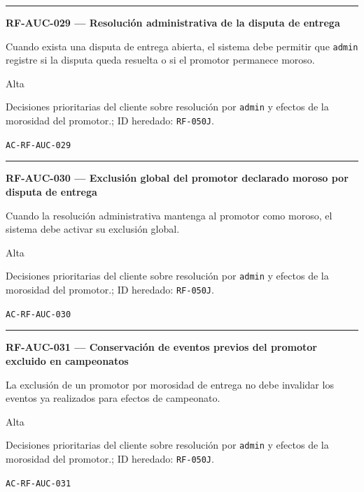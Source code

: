 \documentclass[10pt,letterpaper]{article}
\begin{document}
\vspace{0.25em}\hrule\vspace{0.65em}
\noindent\textbf{RF-AUC-029 --- Resolución administrativa de la disputa de entrega}\par
\begin{description}[style=nextline,leftmargin=3.15cm,labelwidth=2.8cm,font=\normalfont\bfseries]
\item[Obligación] Cuando exista una disputa de entrega abierta, el sistema debe permitir que \texttt{admin} registre si la disputa queda resuelta o si el promotor permanece moroso.
\item[Prioridad] Alta
\item[Procedencia] Decisiones prioritarias del cliente sobre resolución por \texttt{admin} y efectos de la morosidad del promotor.; ID heredado: \texttt{RF-050J}.
\item[Verificación] \texttt{AC-RF-AUC-029}
\end{description}
\vspace{0.25em}\hrule\vspace{0.65em}
\noindent\textbf{RF-AUC-030 --- Exclusión global del promotor declarado moroso por disputa de entrega}\par
\begin{description}[style=nextline,leftmargin=3.15cm,labelwidth=2.8cm,font=\normalfont\bfseries]
\item[Obligación] Cuando la resolución administrativa mantenga al promotor como moroso, el sistema debe activar su exclusión global.
\item[Prioridad] Alta
\item[Procedencia] Decisiones prioritarias del cliente sobre resolución por \texttt{admin} y efectos de la morosidad del promotor.; ID heredado: \texttt{RF-050J}.
\item[Verificación] \texttt{AC-RF-AUC-030}
\end{description}
\vspace{0.25em}\hrule\vspace{0.65em}
\noindent\textbf{RF-AUC-031 --- Conservación de eventos previos del promotor excluido en campeonatos}\par
\begin{description}[style=nextline,leftmargin=3.15cm,labelwidth=2.8cm,font=\normalfont\bfseries]
\item[Obligación] La exclusión de un promotor por morosidad de entrega no debe invalidar los eventos ya realizados para efectos de campeonato.
\item[Prioridad] Alta
\item[Procedencia] Decisiones prioritarias del cliente sobre resolución por \texttt{admin} y efectos de la morosidad del promotor.; ID heredado: \texttt{RF-050J}.
\item[Verificación] \texttt{AC-RF-AUC-031}
\end{description}
\end{document}
